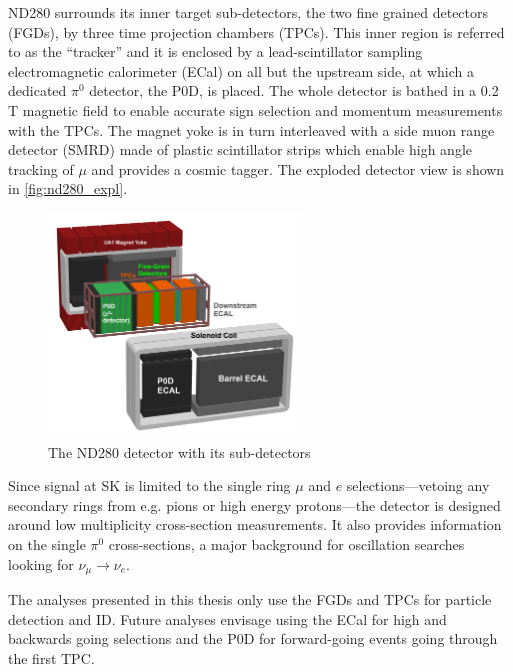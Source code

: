 ND280 surrounds its inner target sub-detectors, the two fine grained detectors (FGDs), by three time projection chambers (TPCs). This inner region is referred to as the ``tracker'' and it is enclosed by a lead-scintillator sampling electromagnetic calorimeter (ECal) on all but the upstream side, at which a dedicated $\pi^0$ detector, the P0D, is placed. The whole detector is bathed in a 0.2 T magnetic field to enable accurate sign selection and momentum measurements with the TPCs. The magnet yoke is in turn interleaved with a side muon range detector (SMRD) made of plastic scintillator strips which enable high angle tracking of $\mu$ and provides a cosmic tagger. The exploded detector view is shown in \autoref{fig:nd280_expl}.
\begin{figure}[h]
	\includegraphics[width=0.6\textwidth, trim={0mm 0mm 0mm 0mm}, clip,page=1]{figures/det_chap/view/ND280Exploded-Text-Transparent-Large}
	\caption{The ND280 detector with its sub-detectors}
	\label{fig:nd280_expl}
\end{figure}

Since signal at SK is limited to the single ring $\mu$ and $e$ selections---vetoing any secondary rings from e.g. pions or high energy protons---the detector is designed around low multiplicity cross-section measurements. It also provides information on the single $\pi^0$ cross-sections, a major background for oscillation searches looking for $\nu_\mu \rightarrow \nu_e$.

The analyses presented in this thesis only use the FGDs and TPCs for particle detection and ID. Future analyses envisage using the ECal for high and backwards going selections and the P0D for forward-going events going through the first TPC.

